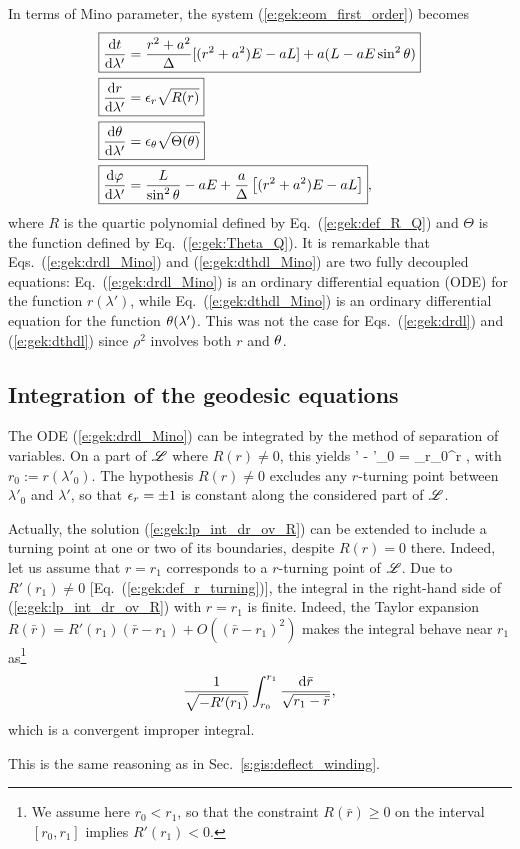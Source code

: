 In terms of Mino parameter, the system (\ref{e:gek:eom_first_order}) becomes
\begin{subequations}
\label{e:gek:eom_Mino}
\begin{align}
& \fbox{$\displaystyle  \frac{\mathrm{d} t}{\mathrm{d} \lambda'} = \frac{r^2 + a^2}{\Delta} [(r^2 + a^2) E - a L] + a ( L - a E \sin^2\theta ) $} \label{e:gek:dtdl_Mino} \\
& \fbox{$\displaystyle  \frac{\mathrm{d} r}{\mathrm{d} \lambda'} = \epsilon_r \sqrt{ R(r) } $} \label{e:gek:drdl_Mino}\\
& \fbox{$\displaystyle  \frac{\mathrm{d} \theta}{\mathrm{d} \lambda'} = \epsilon_\theta \sqrt{\Theta(\theta)} $} \label{e:gek:dthdl_Mino}\\
& \fbox{$\displaystyle  \frac{\mathrm{d} \varphi}{\mathrm{d} \lambda'}  = \frac{L}{\sin^2\theta} - a E
    + \frac{a}{\Delta}\left[(r^2 + a^2) E - a L\right] $} , \label{e:gek:dphdl_Mino}
\end{align}
\end{subequations}
where $R$ is the quartic polynomial defined by Eq.~(\ref{e:gek:def_R_Q})
and $\Theta$ is the function defined by Eq.~(\ref{e:gek:Theta_Q}).
It is remarkable that Eqs.~(\ref{e:gek:drdl_Mino}) and (\ref{e:gek:dthdl_Mino})
are two fully decoupled equations: Eq.~(\ref{e:gek:drdl_Mino}) is an ordinary
differential equation (ODE) for the function $r(\lambda')$, while Eq.~(\ref{e:gek:dthdl_Mino})
is an ordinary differential equation for the function $\theta(\lambda')$. This was
not the case for Eqs.~(\ref{e:gek:drdl}) and (\ref{e:gek:dthdl}) since $\rho^2$ involves
both $r$ and $\theta$.

\subsection{Integration of the geodesic equations} \label{e:gek:integration}

The ODE (\ref{e:gek:drdl_Mino}) can be integrated by the method of separation
of variables. On a part of $\mathscr{L}$ where $R(r)\neq 0$, this yields
\be \label{e:gek:lp_int_dr_ov_R}
    \lambda' - \lambda'_0 =  \int_{r_0}^r  ,
\ee
with $r_0 := r(\lambda'_0)$.
The hypothesis $R(r)\neq 0$
excludes any $r$-turning point between $\lambda'_0$ and $\lambda'$, so that
$\epsilon_r=\pm 1$ is constant along
the considered part of $\mathscr{L}$.

Actually, the solution (\ref{e:gek:lp_int_dr_ov_R})
can be extended to include a turning point at one or two of its boundaries,
despite $R(r)=0$ there.
Indeed, let us assume that $r=r_1$ corresponds to a $r$-turning point of $\mathscr{L}$.
Due to $R'(r_1)\neq 0$ [Eq.~(\ref{e:gek:def_r_turning})], the
integral in the right-hand side of (\ref{e:gek:lp_int_dr_ov_R}) with $r=r_1$
is finite. Indeed,
the Taylor expansion $R(\bar{r}) = R'(r_1) (\bar{r} - r_1) + O((\bar{r} - r_1)^2)$
makes the integral behave near $r_1$
as\footnote{We assume here $r_0<r_1$, so that the constraint
$R(\bar{r})\geq 0$ on the interval $[r_0,r_1]$ implies $R'(r_1)<0$.}
\[
    \frac{1}{\sqrt{-R'(r_1)}} \int_{r_0}^{r_1} \frac{\mathrm{d} \bar{r}}{\sqrt{r_1 - \bar{r}}} ,
\]
which is a convergent improper integral.
\begin{remark}
This is the same reasoning as in Sec.~\ref{s:gis:deflect_winding}.
\end{remark}

